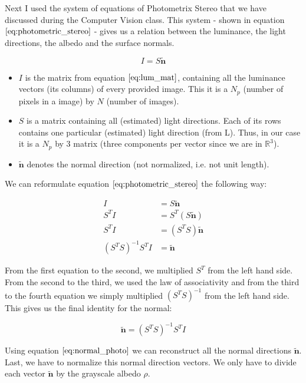 \documentclass{paper}
\begin{document}
Next I used the system of equations of Photometrix Stereo that we have discussed during the Computer Vision class. This system - shown in equation $\ref{eq:photometric_stereo}$ - gives us a relation between the luminance, the light directions, the albedo and the surface normals.

\begin{equation}
     I = S\tilde{\textbf{n}}
\label{eq:photometric_stereo}
\end{equation}

\begin{itemize}
    \item $I$ is the matrix from equation $\ref{eq:lum_mat}$, containing all the luminance vectors (its columns) of every provided image. This it is a $N_p$ (number of pixels in a image) by $N$ (number of images).
    \item $S$ is a matrix containing all (estimated) light directions. Each of its rows contains one particular (estimated) light direction (from L). Thus, in our case it is a $N_p$ by 3 matrix (three components per vector since we are in $\mathbb{R}^3$).
    \item $\tilde{\textbf{n}}$ denotes the normal direction (not normalized, i.e. not unit length).
\end{itemize}

We can reformulate equation $\ref{eq:photometric_stereo}$ the following way:

\begin{align*}
    I &= S\tilde{\textbf{n}} \\
    S^T I &= S^T (S\tilde{\textbf{n}}) \\
    S^T I &= (S^T S)\tilde{\textbf{n}} \\
    (S^T S)^{-1} S^T I &= \tilde{\textbf{n}}
\end{align*}

From the first equation to the second, we multiplied $S^T$ from the left hand side. From the second to the third, we used the law of associativity and from the third to the fourth equation we simply multiplied $(S^T S)^{-1}$ from the left hand side. This gives us the final identity for the normal:

\begin{equation}
    \tilde{\textbf{n}} = (S^T S)^{-1} S^T I 
\label{eq:normal_photo}
\end{equation}

Using equation $\ref{eq:normal_photo}$ we can reconstruct all the normal directions $\tilde{\textbf{n}}$. Last, we have to normalize this normal direction vectors. We only have to divide each vector $\tilde{\textbf{n}}$ by the grayscale albedo $\rho$.
\end{document}
